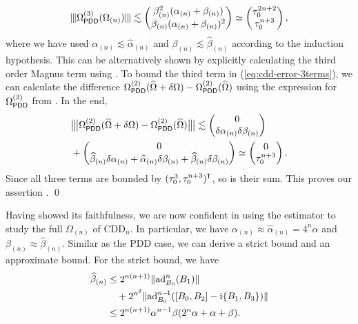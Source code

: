 \documentclass[twocolumn,pra,superscriptaddress]{revtex4-2}
\newcommand{\Opdd}{\Omega_{\mathsf{PDD}}}
\begin{document}
{\begin{equation*}
\opnorm{\Opdd\up{3}(\Omega_{(n)})} 
\lesssim\begin{pmatrix}
\beta_{(n)}^2 (\alpha_{(n)}+\beta_{(n)}) \\
\beta_{(n)} (\alpha_{(n)}+\beta_{(n)})^2
\end{pmatrix}
\simeq \begin{pmatrix}
\Dt^{2n+2}\\
\Dt^{n+3}
\end{pmatrix},
\end{equation*}
where we have used $\alpha_{(n)}\lesssim\widehat\alpha_{(n)}$ and $\beta_{(n)}\lesssim\widehat\beta_{(n)}$ according to the induction hypothesis.
This can be alternatively shown by explicitly calculating the third order Magnus term using . 
To bound the third term in (\ref{eq:cdd-error-3terms}), we can calculate the difference $\Opdd\up{2}(\Ohat+\delta\Omega) - \Opdd\up{2}(\Ohat)$
using the expression for $\Opdd\up{2}$ from .  In the end,
\begin{equation*}
\begin{split}
&\opnorm[\big]{\Opdd\up{2}(\Ohat+\delta\Omega) - \Opdd\up{2}(\Ohat)} 
\lesssim\begin{pmatrix}
    0\\
    \delta\alpha_{(n)}\delta\beta_{(n)}
\end{pmatrix}\\
&+\begin{pmatrix}
    0\\
    \widehat\beta_{(n)}\delta\alpha_{(n)} + \widehat\alpha_{(n)} \delta\beta_{(n)}
    +\widehat\beta_{(n)} \delta\beta_{(n)} 
\end{pmatrix}\simeq
\begin{pmatrix}
    0\\
    \Dt^{n+3}
\end{pmatrix}.
\end{split}
\end{equation*}
Since all three terms are bounded by $(\tau_0^3, \tau_0^{n+3})^{\mkern-1.5mu\mathsf{T}}$, so is their sum. This proves our assertion . \qed

\smallskip

Having showed its faithfulness, we are now confident in using the estimator  to study the full $\Omega_{(n)}$ of $\mathrm{CDD}_n$. In particular, we have $\alpha_{(n)}\approx\widehat\alpha_{(n)}=4^n \alpha$ and
$\beta_{(n)}\approx\widehat{\beta}_{(n)}$.
Similar as the PDD case, we can derive a strict bound and an approximate bound. For the strict bound, we have
\begin{equation}\label{eq:cdd-errph-bound1}
\begin{aligned}
\widehat{\beta}_{(n)} &\le   2^{n(n+1)}\Vert {\operatorname{ad}_{B_0}^{n}(B_1)} \Vert \\
&\quad + 2^{n^2} 
\Vert {\operatorname{ad}_{B_0}^{n-\!1}([B_0,B_2] - \mathrm{i}\{B_1,B_3\})} \Vert\\
&\le  2^{n(n+1)}\alpha^{n-1}\beta (2^n \alpha+ \alpha + \beta).
\end{aligned}
\end{equation}
}









\appendix
\end{document}
